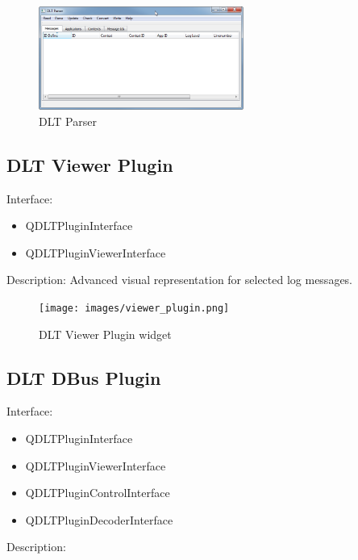 \documentclass[a4paper,11pt]{article}
\begin{document}
\begin{figure}[H]
 \centering
 \includegraphics[width=0.6\textwidth]{images/dlt_parser.png}
 \caption{DLT Parser}
 \label{fig:dltparser}
\end{figure}




\subsection{DLT Viewer Plugin}

Interface:
\begin{itemize}
   \item  QDLTPluginInterface
   \item  QDLTPluginViewerInterface
\end{itemize}

Description:
    Advanced visual representation for selected log messages.
\linebreak

\begin{figure}[H]
 \centering
 \texttt{[image: images/viewer\_plugin.png]}
 \caption{DLT Viewer Plugin widget}
 \label{fig:viewerpluginwidget}
\end{figure}


\subsection{DLT DBus Plugin}

Interface:
\begin{itemize}
    \item QDLTPluginInterface
    \item QDLTPluginViewerInterface
    \item QDLTPluginControlInterface
    \item QDLTPluginDecoderInterface
\end{itemize}
Description:\linebreak
\end{document}
